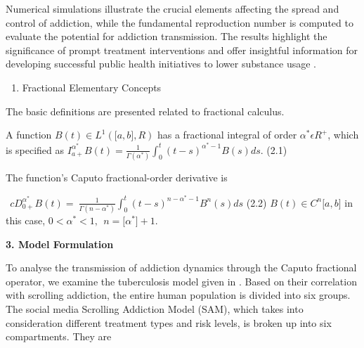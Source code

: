 \documentclass[10pt]{NSP1}
\begin{document}
Numerical simulations illustrate the crucial elements affecting the spread and control of addiction, while the fundamental reproduction number is computed to evaluate the potential for addiction transmission. The results highlight the significance of prompt treatment interventions and offer insightful information for developing successful public health initiatives to lower substance usage \cite{ref15, ref16, ref17, ref18, ref19, ref20}.

\begin{enumerate}
  \item Fractional Elementary Concepts
\end{enumerate}

The basic definitions are presented related to fractional calculus.

\par\medskip{}\smallskip

A function \(B(t) \in L^{1}(\lbrack a,b\rbrack,R)\) has a fractional integral of order \(\alpha^{\ast}\epsilon R^{+}\), which is specified as \(I_{a +}^{\alpha^{\ast}}B(t) = \frac{1}{\Gamma(\alpha^{\ast})}\int_{0}^{t}{}{(t - s)}^{\alpha^{\ast} - 1}B(s)ds\). (2.1)

\par\medskip{}\smallskip

The function's Caputo fractional-order derivative is

\({\ \ cD}_{0 +}^{\alpha^{\ast}}B(t) = \ \frac{1}{\Gamma(n - \alpha^{\ast})}\int_{0}^{t}{}(t - s)^{n - \alpha^{\ast} - 1}B^{n}(s)ds\) (2.2) \(B(t) \in C^{n}\lbrack a,b\rbrack\) in this case, \(0 < \alpha^{\ast} < 1,\ \ n = \lbrack\alpha^{\ast}\rbrack + 1.\)

\par\medskip\noindent \begin{center}\large\bfseries 3. Model Formulation\end{center}\smallskip

To analyse the transmission of addiction dynamics through the Caputo fractional operator, we examine the tuberculosis model given in \cite{ref10} . Based on their correlation with scrolling addiction, the entire human population is divided into six groups. The social media Scrolling Addiction Model (SAM), which takes into consideration different treatment types and risk levels, is broken up into six compartments. They are
\end{document}

